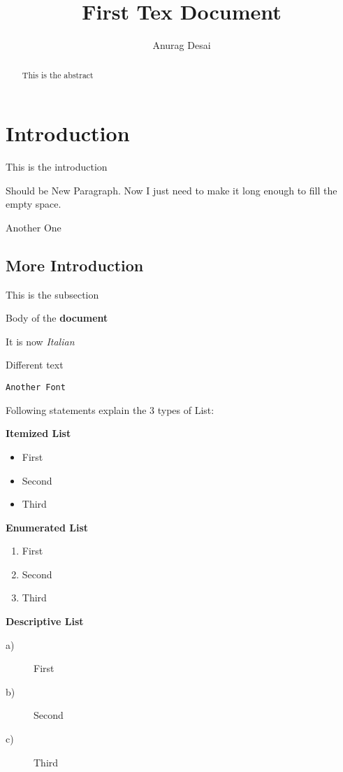 \documentclass{article}
\begin{document}
	\title{First Tex Document}
	\author{Anurag Desai}
	\maketitle
	\begin{abstract}
		This is the abstract
	\end{abstract}
	\section{Introduction}
	This is the introduction
	
	Should be New Paragraph. Now I just need to make it long enough to fill the empty space.
	
	Another One
	
	\subsection{More Introduction}
	This is the subsection
	
	Body of the \textbf{document}
	
	It is now \textit{Italian}
	
	\textsf{Different text}
	
	\texttt{Another Font}
	
	Following statements explain the 3 types of List:
	
	\textbf{Itemized List}
		\begin{itemize}
			\item First
			\item Second
			\item Third
		\end{itemize}
	
	\textbf{Enumerated List}
		\begin{enumerate}
			\item First
			\item Second
			\item Third
		\end{enumerate}
	
	\textbf{Descriptive List}
		\begin{description}
			\item[a)] First
			\item[b)] Second
			\item[c)] Third
		\end{description}
\end{document}

